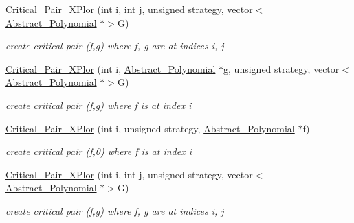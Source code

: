 \begin{Indent}
\begin{DoxyCompactItemize}
\mbox{\label{class_critical___pair___x_plor_af5d0947e70b4070f796f1b0d8ce75484}} 
\hyperlink{class_critical___pair___x_plor_af5d0947e70b4070f796f1b0d8ce75484}{Critical\+\_\+\+Pair\+\_\+\+X\+Plor} (int i, int j, unsigned strategy, vector$<$ \hyperlink{class_abstract___polynomial}{Abstract\+\_\+\+Polynomial} $\ast$$>$G)
\begin{DoxyCompactList}\small\item\em create critical pair (f,g) where f, g are at indices {\ttfamily i}, {\ttfamily j} \end{DoxyCompactList}\item 
\mbox{\label{class_critical___pair___x_plor_a1cafe8e84ec3bee5e63370b7b815ba71}} 
\hyperlink{class_critical___pair___x_plor_a1cafe8e84ec3bee5e63370b7b815ba71}{Critical\+\_\+\+Pair\+\_\+\+X\+Plor} (int i, \hyperlink{class_abstract___polynomial}{Abstract\+\_\+\+Polynomial} $\ast$g, unsigned strategy, vector$<$ \hyperlink{class_abstract___polynomial}{Abstract\+\_\+\+Polynomial} $\ast$$>$G)
\begin{DoxyCompactList}\small\item\em create critical pair (f,g) where f is at index {\ttfamily i} \end{DoxyCompactList}\item 
\mbox{\label{class_critical___pair___x_plor_ac1564546db9b4736444a614970c1796d}} 
\hyperlink{class_critical___pair___x_plor_ac1564546db9b4736444a614970c1796d}{Critical\+\_\+\+Pair\+\_\+\+X\+Plor} (int i, unsigned strategy, \hyperlink{class_abstract___polynomial}{Abstract\+\_\+\+Polynomial} $\ast$f)
\begin{DoxyCompactList}\small\item\em create critical pair (f,0) where f is at index {\ttfamily i} \end{DoxyCompactList}\item 
\mbox{\label{class_critical___pair___x_plor_af5d0947e70b4070f796f1b0d8ce75484}} 
\hyperlink{class_critical___pair___x_plor_af5d0947e70b4070f796f1b0d8ce75484}{Critical\+\_\+\+Pair\+\_\+\+X\+Plor} (int i, int j, unsigned strategy, vector$<$ \hyperlink{class_abstract___polynomial}{Abstract\+\_\+\+Polynomial} $\ast$$>$G)
\begin{DoxyCompactList}\small\item\em create critical pair (f,g) where f, g are at indices {\ttfamily i}, {\ttfamily j} \end{DoxyCompactList}\item 
$$
\end{DoxyCompactItemize}
\end{Indent}
